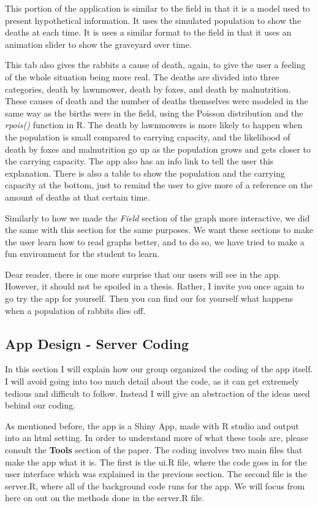\documentclass{article}\usepackage[]{graphicx}\usepackage[]{color}
\begin{document}
This portion of the application is similar to the field in that it is a model used to present hypothetical information. It uses the simulated population to show the deaths at each time. It is uses a similar format to the field in that it uses an animation slider to show the graveyard over time. 

This tab also gives the rabbits a cause of death, again, to give the user a feeling of the whole situation being more real. The deaths are divided into three categories, death by lawnmower, death by foxes, and death by malnutrition. These causes of death and the number of deaths themselves were modeled in the same way as the births were in the field, using the Poisson distribution and the \textit{rpois()} function in R. The death by lawnmowers is more likely to happen when the population is small compared to carrying capacity, and the likelihood of death by foxes and malnutrition go up as the population grows and gets closer to the carrying capacity. The app also has an info link to tell the user this explanation. There is also a table to show the population and the carrying capacity at the bottom, just to remind the user to give more of a reference on the amount of deaths at that certain time. 

Similarly to how we made the \textit{Field} section of the graph more interactive, we did the same with this section for the same purposes. We want these sections to make the user learn how to read graphs better, and to do so, we have tried to make a fun environment for the student to learn.

Dear reader, there is one more surprise that our users will see in the app. However, it should not be spoiled in a thesis. Rather, I invite you once again to go try the app for yourself. Then you can find our for yourself what happens when a population of rabbits dies off.




\subsection{App Design - Server Coding}

In this section I will explain how our group organized the coding of the app itself. I will avoid going into too much detail about the code, as it can get extremely tedious and difficult to follow. Instead I will give an abstraction of the ideas used behind our coding.

As mentioned before, the app is a Shiny App, made with R studio and output into an html setting. In order to understand more of what these tools are, please consult the \textbf{Tools} section of the paper. The coding involves two main files that make the app what it is. The first is the ui.R file, where the code goes in for the user interface which was explained in the previous section. The second file is the server.R, where all of the background code runs for the app. We will focus from here on out on the methods done in the server.R file. 
\end{document}
